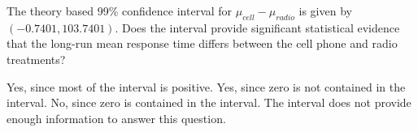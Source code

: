 \documentclass{article}
\begin{document}
\begin{mcquestions}
		\question The theory based 99\% confidence interval for $\mu_{{cell}}-\mu_{{radio}}$ is given by $(-0.7401,103.7401)$. Does the interval provide significant statistical evidence that the long-run mean response time differs between the cell phone and radio treatments?
		\begin{mcanswerslist}
			\answer Yes, since most of the interval is positive.
			\answer Yes, since zero is not contained in the interval.
			\answer[correct] No, since zero is contained in the interval.
			\answer The interval does not provide enough information to answer this question.
		\end{mcanswerslist}
		
		
	\end{mcquestions}
\end{document}
